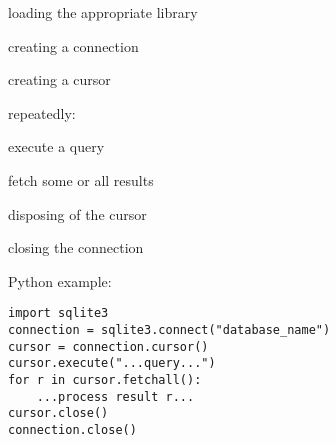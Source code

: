 \begin{swcitemize}
\item
  loading the appropriate library
\item
  creating a connection
\item
  creating a cursor
\item
  repeatedly:

  \begin{swcitemize2}
  \item
    execute a query
  \item
    fetch some or all results
   \end{swcitemize2}
\item
  disposing of the cursor
\item
  closing the connection
\end{swcitemize}

Python example:

\begin{Verbatim}
import sqlite3
connection = sqlite3.connect("database_name")
cursor = connection.cursor()
cursor.execute("...query...")
for r in cursor.fetchall():
    ...process result r...
cursor.close()
connection.close()
\end{Verbatim}
